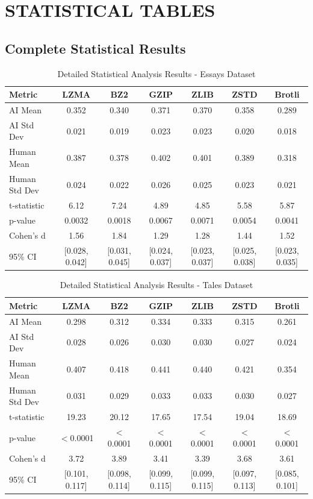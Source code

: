 \documentclass[12pt,a4paper]{report}
\begin{document}
\chapter{STATISTICAL TABLES}

\section{Complete Statistical Results}

\begin{table}[ht]
\centering
\caption{Detailed Statistical Analysis Results - Essays Dataset}
\begin{tabular}{lcccccc}
\toprule
\textbf{Metric} & \textbf{LZMA} & \textbf{BZ2} & \textbf{GZIP} & \textbf{ZLIB} & \textbf{ZSTD} & \textbf{Brotli} \\
\midrule
AI Mean & 0.352 & 0.340 & 0.371 & 0.370 & 0.358 & 0.289 \\
AI Std Dev & 0.021 & 0.019 & 0.023 & 0.023 & 0.020 & 0.018 \\
Human Mean & 0.387 & 0.378 & 0.402 & 0.401 & 0.389 & 0.318 \\
Human Std Dev & 0.024 & 0.022 & 0.026 & 0.025 & 0.023 & 0.021 \\
t-statistic & 6.12 & 7.24 & 4.89 & 4.85 & 5.58 & 5.87 \\
p-value & 0.0032 & 0.0018 & 0.0067 & 0.0071 & 0.0054 & 0.0041 \\
Cohen's d & 1.56 & 1.84 & 1.29 & 1.28 & 1.44 & 1.52 \\
95\% CI & [0.028, 0.042] & [0.031, 0.045] & [0.024, 0.037] & [0.023, 0.037] & [0.025, 0.038] & [0.023, 0.035] \\
\bottomrule
\end{tabular}
\end{table}

\begin{table}[ht]
\centering
\caption{Detailed Statistical Analysis Results - Tales Dataset}
\begin{tabular}{lcccccc}
\toprule
\textbf{Metric} & \textbf{LZMA} & \textbf{BZ2} & \textbf{GZIP} & \textbf{ZLIB} & \textbf{ZSTD} & \textbf{Brotli} \\
\midrule
AI Mean & 0.298 & 0.312 & 0.334 & 0.333 & 0.315 & 0.261 \\
AI Std Dev & 0.028 & 0.026 & 0.030 & 0.030 & 0.027 & 0.024 \\
Human Mean & 0.407 & 0.418 & 0.441 & 0.440 & 0.421 & 0.354 \\
Human Std Dev & 0.031 & 0.029 & 0.033 & 0.033 & 0.030 & 0.027 \\
t-statistic & 19.23 & 20.12 & 17.65 & 17.54 & 19.04 & 18.69 \\
p-value & $<$0.0001 & $<$0.0001 & $<$0.0001 & $<$0.0001 & $<$0.0001 & $<$0.0001 \\
Cohen's d & 3.72 & 3.89 & 3.41 & 3.39 & 3.68 & 3.61 \\
95\% CI & [0.101, 0.117] & [0.098, 0.114] & [0.099, 0.115] & [0.099, 0.115] & [0.097, 0.113] & [0.085, 0.101] \\
\bottomrule
\end{tabular}
\end{table}
\end{document}
